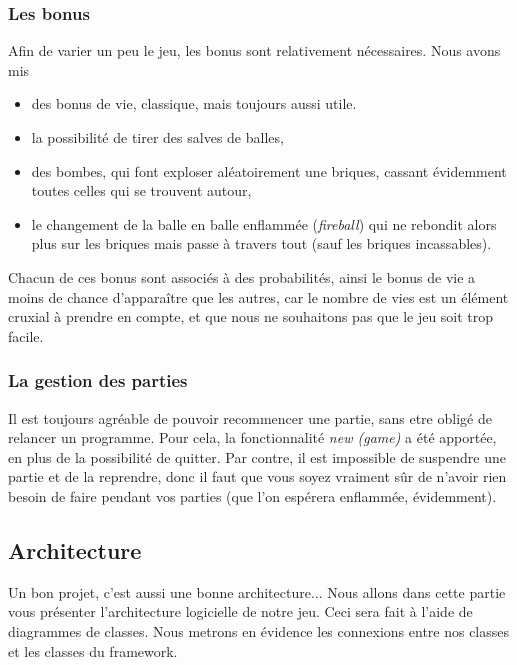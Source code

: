 \documentclass[a4paper,10pt]{article}
\begin{document}
    \subsubsection{Les bonus}
        Afin de varier un peu le jeu, les bonus sont relativement nécessaires. Nous avons mis
        \begin{itemize}
            \item des bonus de vie, classique, mais toujours aussi utile.
            \item la possibilité de tirer des salves de balles,
            \item des bombes, qui font exploser aléatoirement une briques, cassant évidemment
                    toutes celles qui se trouvent autour,
            \item le changement de la balle en balle enflammée (\textit{fireball}) qui ne rebondit
                    alors plus sur les briques mais passe à travers tout (sauf les briques incassables).
        \end{itemize}

        Chacun de ces bonus sont associés à des probabilités, ainsi le bonus de vie a moins
        de chance d'apparaître que les autres, car le nombre de vies est un élément cruxial à prendre
        en compte, et que nous ne souhaitons pas que le jeu soit trop facile.

    \subsubsection{La gestion des parties}
        Il est toujours agréable de pouvoir recommencer une partie, sans etre obligé de relancer un
        programme. Pour cela, la fonctionnalité \textit{new (game)} a été apportée, en plus de la
        possibilité de quitter. Par contre, il est impossible de suspendre une partie et de la reprendre,
        donc il faut que vous soyez vraiment sûr de n'avoir rien besoin de faire pendant vos parties
        (que l'on espérera enflammée, évidemment).


\subsection{Architecture}
    Un bon projet, c'est aussi une bonne architecture...
	Nous allons dans cette partie vous présenter l'architecture logicielle de notre jeu. Ceci sera fait à l'aide de
	diagrammes de classes.
	Nous metrons en évidence les connexions entre nos classes et les classes du framework.
\end{document}
